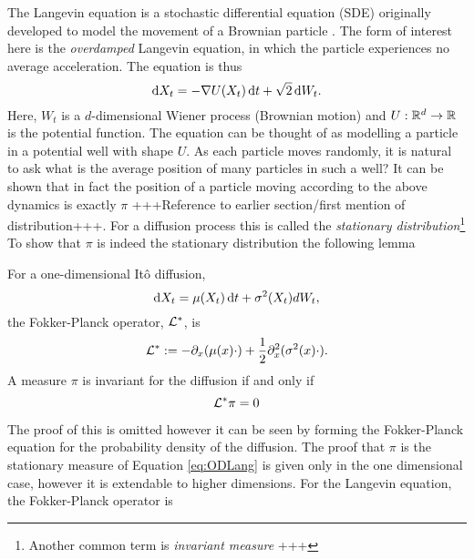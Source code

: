 The Langevin equation is a stochastic differential equation (SDE) originally developed to model the movement of a Brownian particle 	\cite{Langevin1908}. The form of interest here is the \emph{overdamped} Langevin equation, in which the particle experiences no average acceleration. The equation is thus
	\begin{equation} \mathop{}\!\mathrm{d} X_t = -\nabla U(X_t)\mathop{}\!\mathrm{d} t +\sqrt{2}\mathop{}\!\mathrm{d} W_t. \label{eq:ODLang}\end{equation}
Here, \(W_t\) is a \(d\)-dimensional Wiener process (Brownian motion) and \(U:\mathbb{R}^d \to \mathbb{R}\) is the potential function. The equation can be thought of as modelling a particle in a potential well with shape \(U\). As each particle moves randomly, it is natural to ask what is the average position of many particles in such a well? It can be shown that in fact the position of a particle moving according to the above dynamics is exactly \(\pi\) +++Reference to earlier section/first mention of distribution+++. For a diffusion process this is called the \emph{stationary distribution}\footnote{Another common term is \emph{invariant measure} +++} To show that \(\pi\) is indeed the stationary distribution the following lemma

\begin{lemma}
	For a one-dimensional It\^o diffusion,
	\[\mathop{}\!\mathrm{d} X_t = \mu(X_t)\mathop{}\!\mathrm{d} t + \sigma^2(X_t)dW_t,\]
	the Fokker-Planck operator, \(\mathcal{L}^*\), is
	\[\mathcal{L}^*:= -\partial_x(\mu(x)\cdot)+\frac{1}{2}\partial^2_x(\sigma^2(x)\cdot).\]
	A measure \(\pi\) is invariant for the diffusion if and only if
	\[\mathcal{L}^*\pi = 0\]
\end{lemma}
The proof of this is omitted however it can be seen by forming the Fokker-Planck equation for the probability density of the diffusion. The proof that \(\pi\) is the stationary measure of Equation \eqref{eq:ODLang} is given only in the one dimensional case, however it is extendable to higher dimensions. For the Langevin equation, the Fokker-Planck operator is

